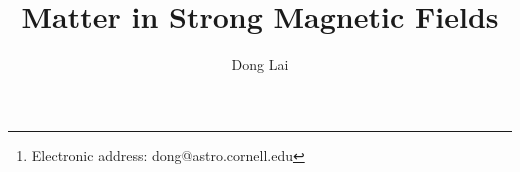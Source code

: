 
\newcommand{\av}[1]{\langle #1\rangle}
\newcommand{\be}{\begin{equation}}
\newcommand{\ee}{\end{equation}}
\def\ba{\begin{eqnarray}}
\def\ea{\end{eqnarray}}
\def\go{\mathrel{\raise.3ex\hbox{$>$}\mkern-14mu\lower0.6ex\hbox{$\sim$}}}
\def\lo{\mathrel{\raise.3ex\hbox{$<$}\mkern-14mu\lower0.6ex\hbox{$\sim$}}}
\def\eps {{\varepsilon}}
\def\bB {{\bf B}}
\def\rH {{\rm H}}
\def\rG {{\rm G}}
\def\reV {{\rm eV}}
\def\rkeV {{\rm keV}}
\def\rcm {{\rm cm}}

\def\br{{\bf r}}
\def\brp{{\bf r_{\perp}}}
\def\bv{{\bf v}}
\def\bR {{\bf R}}
\def\bb {{\bf b}}
\def\bK {{\bf K}}
\def\bp {{\bf p}}
\def\bA {{\bf A}}
\def\bPi {{\bf \Pi}}
\def\cE {{\cal E}}
\def\cA {{\cal A}}
\def\cE {{\cal E}}
\def\cH {{\cal H}}
\def\bsigma{{\mbox{\boldmath $\sigma$}}}
\def\etal {{\it et al.}}




\title{Matter in Strong Magnetic Fields}
\author{Dong Lai}
\address{Center for Radiophysics and Space Research, Department of Astronomy,
Space Sciences Building\\
Cornell University, Ithaca, NY 14853~\footnote{Electronic address:
dong@astro.cornell.edu}}
\maketitle

